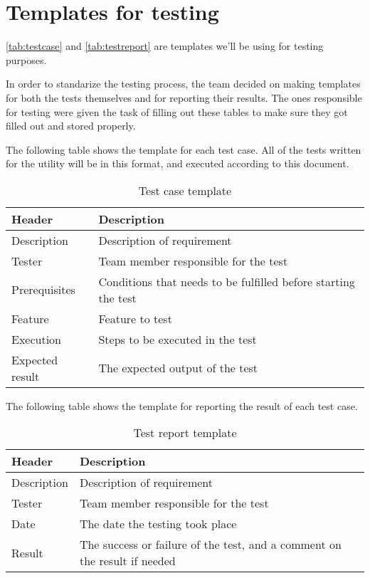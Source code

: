 \section{Templates for testing}
\autoref{tab:testcase} and \autoref{tab:testreport} are templates we'll be
using for testing purposes.

In order to standarize the testing process, the team decided on making templates for both the tests themselves and for reporting their results. The ones responsible for testing were given the task of filling out these tables to make sure they got filled out and stored properly.

The following table shows the template for each test case. All of the tests written for the utility will be in this format, and executed according to this document.

\begin{table}[htb] \small \center
\caption{Test case template \label{tab:testcase}}
\begin{tabular}{l l}
	\toprule
	Header & Description \\
	\midrule
	Description & Description of requirement \\
	Tester & Team member responsible for the test \\
	Prerequisites & Conditions that needs to be fulfilled before starting the test \\
	Feature & Feature to test \\
	Execution & Steps to be executed in the test \\
	Expected result & The expected output of the test \\
	\bottomrule
\end{tabular}
\end{table}

The following table shows the template for reporting the result of each test case.

\begin{table}[htb] \small \center
\caption{Test report template \label{tab:testreport}}
\begin{tabular}{l l}
	\toprule
	Header & Description \\
	\midrule
	Description & Description of requirement \\
	Tester & Team member responsible for the test \\
	Date & The date the testing took place \\
	Result & The success or failure of the test, and a comment on the result if needed \\
	\bottomrule
\end{tabular}
\end{table}


